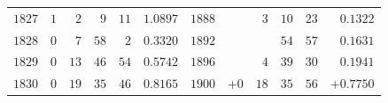 \begin{center}
{{\begin{minipage}{.96\linewidth}
\begin{tabular}{r|rrrr|r||r|rrrr|r}
$1827$ & $1$ & $2$ & $9$ & $11$ & $1.0897$ & $1888$ &  & $3$ & $10$ & $23$ & $0.1322$\\
$1828$ & $0$ & $7$ & $58$ & $2$ & $0.3320$ & $1892$ &  &  & $54$ & $57$ & $0.1631$\\
$1829$ & $0$ & $13$ & $46$ & $54$ & $0.5742$ & $1896$ &  & $4$ & $39$ & $30$ & $0.1941$\\
$1830$ & $0$ & $19$ & $35$ & $46$ & $0.8165$ & $1900$ & $+0$ & $18$ & $35$ & $56$ & $+0.7750$\\
\end{tabular}
\endgroup
\end{minipage}}}\endgroup
\end{center}
\clearpage
{}%
\begin{center}
\begingroup\setlength{\fboxsep}{1.2pt}\setlength{\fboxrule}{0.45pt}
\end{center}
